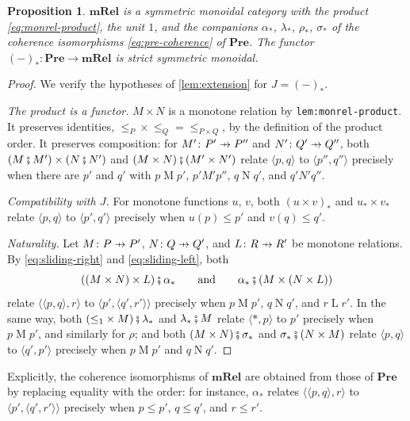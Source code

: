 \documentclass[11pt,a4paper]{article}
\theoremstyle{plain}
\newtheorem{proposition}[theorem]{Proposition}
\theoremstyle{definition}
\theoremstyle{remark}
\newcommand{\Cat}[1]{\mathbf{#1}}
\newcommand{\Pre}{\Cat{Pre}}
\newcommand{\mRel}{\Cat{mRel}}
\newcommand{\then}{\mathbin{\fatsemi}}
\newcommand{\tup}[1]{\langle #1 \rangle}
\newcommand{\profto}{\mathrel{\ooalign{\hfil$\mapstochar\mkern 5mu$\hfil\cr$\to$\cr}}}
\newcommand{\rel}[3]{#1 \mathrel{#2} #3}
\newcommand{\comp}[1]{#1_{*}}
\newcommand{\lbl}[1]{\nolinkurl{#1}}
\begin{document}
\begin{proposition}
    \label{prop:mrel-monoidal}
    $\mRel$ is a symmetric monoidal category with the product \cref{eq:monrel-product}, the unit $1$, and the companions $\comp{\alpha}$, $\comp{\lambda}$, $\comp{\rho}$, $\comp{\sigma}$ of the coherence isomorphisms \cref{eq:pre-coherence} of $\Pre$.
    The functor $\comp{(-)} \colon \Pre \to \mRel$ is strict symmetric monoidal.
\end{proposition}
\begin{proof}
    We verify the hypotheses of \cref{lem:extension} for $J = \comp{(-)}$.

    \emph{The product is a functor.}
    $M \times N$ is a monotone relation by \lbl{lem:monrel-product}.
    It preserves identities, ${\leq_P} \times {\leq_Q} = {\leq_{P \times Q}}$, by the definition of the product order.
    It preserves composition: for $M' \colon P' \profto P''$ and $N' \colon Q' \profto Q''$, both $(M \then M') \times (N \then N')$ and $(M \times N) \then (M' \times N')$ relate $\tup{p,q}$ to $\tup{p'',q''}$ precisely when there are $p'$ and $q'$ with $\rel{p}{M}{p'}$, $\rel{p'}{M'}{p''}$, $\rel{q}{N}{q'}$, and $\rel{q'}{N'}{q''}$.

    \emph{Compatibility with $J$.}
    For monotone functions $u$, $v$, both $\comp{(u \times v)}$ and $\comp{u} \times \comp{v}$ relate $\tup{p,q}$ to $\tup{p',q'}$ precisely when $u(p) \leq p'$ and $v(q) \leq q'$.

    \emph{Naturality.}
    Let $M \colon P \profto P'$, $N \colon Q \profto Q'$, and $L \colon R \profto R'$ be monotone relations.
    By \cref{eq:sliding-right} and \cref{eq:sliding-left}, both
    \begin{equation*}
        ((M \times N) \times L) \then \comp{\alpha}
        \qquad \text{and} \qquad
        \comp{\alpha} \then (M \times (N \times L))
    \end{equation*}
    relate $\tup{\tup{p,q},r}$ to $\tup{p',\tup{q',r'}}$ precisely when $\rel{p}{M}{p'}$, $\rel{q}{N}{q'}$, and $\rel{r}{L}{r'}$.
    In the same way, both $({\leq_1} \times M) \then \comp{\lambda}$ and $\comp{\lambda} \then M$ relate $\tup{*,p}$ to $p'$ precisely when $\rel{p}{M}{p'}$, and similarly for $\rho$; and both $(M \times N) \then \comp{\sigma}$ and $\comp{\sigma} \then (N \times M)$ relate $\tup{p,q}$ to $\tup{q',p'}$ precisely when $\rel{p}{M}{p'}$ and $\rel{q}{N}{q'}$.
\end{proof}

Explicitly, the coherence isomorphisms of $\mRel$ are obtained from those of $\Pre$ by replacing equality with the order: for instance, $\comp{\alpha}$ relates $\tup{\tup{p,q},r}$ to $\tup{p',\tup{q',r'}}$ precisely when $p \leq p'$, $q \leq q'$, and $r \leq r'$.
\end{document}
